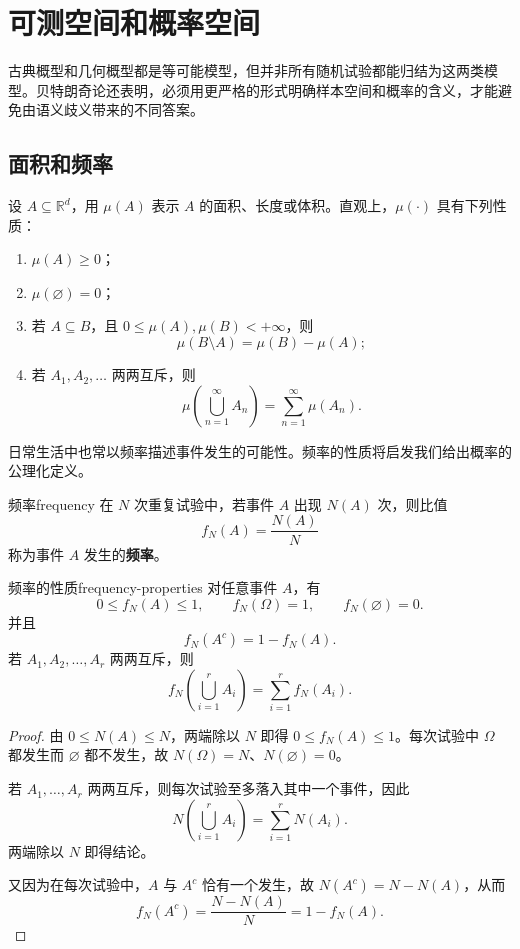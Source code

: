 \vspace{2\baselineskip}

\section{可测空间和概率空间}

古典概型和几何概型都是等可能模型，但并非所有随机试验都能归结为这两类模型。贝特朗奇论还表明，必须用更严格的形式明确样本空间和概率的含义，才能避免由语义歧义带来的不同答案。

\subsection*{面积和频率}

设 $A\subseteq\mathbb{R}^d$，用 $\mu(A)$ 表示 $A$ 的面积、长度或体积。直观上，$\mu(\cdot)$ 具有下列性质：
\begin{enumerate}
\item $\mu(A)\geq0$；
\item $\mu(\varnothing)=0$；
\item 若 $A\subseteq B$，且 $0\leq\mu(A),\mu(B)<+\infty$，则
\[
\mu(B\setminus A)=\mu(B)-\mu(A);
\]
\item 若 $A_1,A_2,\ldots$ 两两互斥，则
\[
\mu\left(\bigcup_{n=1}^{\infty}A_n\right)
=\sum_{n=1}^{\infty}\mu(A_n).
\]
\end{enumerate}

日常生活中也常以频率描述事件发生的可能性。频率的性质将启发我们给出概率的公理化定义。

\begin{mydefinition}{频率}{frequency}
在 $N$ 次重复试验中，若事件 $A$ 出现 $N(A)$ 次，则比值
\[
f_N(A)=\dfrac{N(A)}{N}
\]
称为事件 $A$ 发生的\textbf{频率}。
\end{mydefinition}

\begin{proposition}{频率的性质}{frequency-properties}
对任意事件 $A$，有
\[
0\leq f_N(A)\leq1,
\qquad
f_N(\Omega)=1,
\qquad
f_N(\varnothing)=0.
\]
并且
\[
f_N(A^c)=1-f_N(A).
\]
若 $A_1,A_2,\ldots,A_r$ 两两互斥，则
\[
f_N\left(\bigcup_{i=1}^{r}A_i\right)
=\sum_{i=1}^{r}f_N(A_i).
\]
\end{proposition}

\begin{proof}
由 $0\leq N(A)\leq N$，两端除以 $N$ 即得 $0\leq f_N(A)\leq1$。每次试验中 $\Omega$ 都发生而 $\varnothing$ 都不发生，故 $N(\Omega)=N$、$N(\varnothing)=0$。

若 $A_1,\ldots,A_r$ 两两互斥，则每次试验至多落入其中一个事件，因此
\[
N\left(\bigcup_{i=1}^{r}A_i\right)=\sum_{i=1}^{r}N(A_i).
\]
两端除以 $N$ 即得结论。

又因为在每次试验中，$A$ 与 $A^c$ 恰有一个发生，故 $N(A^c)=N-N(A)$，从而
\[
f_N(A^c)=\dfrac{N-N(A)}{N}=1-f_N(A).
\]
\end{proof}

